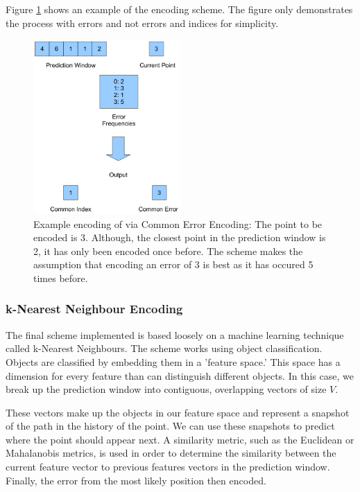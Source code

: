 \documentclass[a4paper,11pt]{report}
\begin{document}
Figure \ref{CommonDescrip} shows an example of the encoding scheme. The figure only demonstrates the process with errors and not errors and indices for simplicity.

\begin{figure}
 \center
 \includegraphics[width=0.5\textwidth]{resources/Common.png}
\caption{Example encoding of via Common Error Encoding: The point to be encoded is 3. Although, the closest point in the prediction window is 2, it has only been encoded once before. The scheme makes the assumption that encoding an error of 3 is best as it has occured 5 times before.}
\label{CommonDescrip}
\end{figure}

\subsubsection{k-Nearest Neighbour Encoding}

The final scheme implemented is based loosely on a machine learning technique called k-Nearest Neighbours\cite{duda2001pattern}. The scheme works using object classification. Objects are classified by embedding them in a 'feature space.' This space has a dimension for every feature than can distinguish different objects. In this case, we break up the prediction window into contiguous, overlapping vectors of size $V$. 

These vectors make up the objects in our feature space and represent a snapshot of the path in the history of the point. We can use these snapshots to predict where the point should appear next. A similarity metric, such as the Euclidean or Mahalanobis metrics, is used in order to determine the similarity between the current feature vector to previous features vectors in the prediction window. Finally, the error from the most likely position then encoded.
\end{document}
